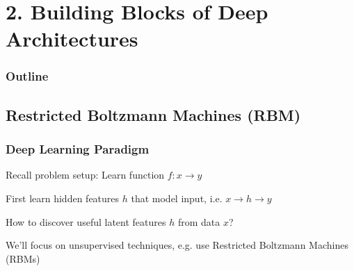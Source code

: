 \section[Building Blocks]{2. Building Blocks of Deep Architectures}
\begin{frame}
\small{\frametitle{Outline}
\tableofcontents
}
\end{frame}


\subsection[RBM]{Restricted Boltzmann Machines (RBM)}

\begin{frame}
\frametitle{Deep Learning Paradigm}
\bi
\item Recall problem setup: Learn function {\color{red} $f: x \rightarrow y$ }
\pause
\item First learn hidden features $h$ that model input, i.e.  {\color{red} $x \rightarrow h \rightarrow y$}
\pause
\item How to discover useful latent features $h$ from data $x$? 
\bi 
	\item We'll focus on unsupervised techniques, e.g. use Restricted Boltzmann Machines (RBMs)
\ei
\ei
\end{frame}





